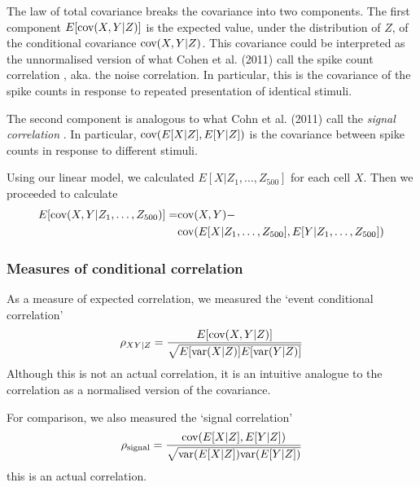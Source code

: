         The law of total covariance breaks the covariance into two components. The first component $E[\text{cov}(X,Y|Z)]$ is the expected value, under the distribution of $Z$, of the conditional covariance $\text{cov}(X,Y|Z)$. This covariance could be interpreted as the unnormalised version of what Cohen et al. (2011) call the spike count correlation \parencite{cohen2}, aka. the noise correlation. In particular, this is the covariance of the spike counts in response to repeated presentation of identical stimuli.

        The second component is analogous to what Cohn et al. (2011) call the \textit{signal correlation} \parencite{cohen2}. In particular, $\text{cov}(E[X|Z], E[Y|Z])$ is the covariance between spike counts in response to different stimuli.

        Using our linear model, we calculated $E[X|Z_1,\dots, Z_{500}]$ for each cell $X$. Then we proceeded to calculate
        \begin{equation}
            \begin{split}
                E[\text{cov}(X,Y|Z_1,\dots, Z_{500})] = & \text{cov}(X,Y) - \\
                  & \text{cov}(E[X|Z_1,\dots, Z_{500}], E[Y|Z_1,\dots, Z_{500}])
            \end{split}
        \end{equation}

        \subsubsection{Measures of conditional correlation}\label{sec:cond_corr}
        As a measure of expected correlation, we measured the `event conditional correlation'  \parencite{maugis}
        \begin{align}\label{eq:event_conditional_correlation}
            \rho_{XY|Z} = \frac{E[\text{cov}(X,Y|Z)]}{\sqrt{E[\text{var}(X|Z)]E[\text{var}(Y|Z)]}}
        \end{align}
        Although this is not an actual correlation, it is an intuitive analogue to the correlation as a normalised version of the covariance.

        For comparison, we also measured the `signal correlation'
        \begin{align}\label{eq:signal_correlation}
            \rho_{\text{signal}} = \frac{\text{cov}(E[X|Z], E[Y|Z])}{\sqrt{\text{var}(E[X|Z])\text{var}(E[Y|Z])}}
        \end{align}
        this is an actual correlation.

